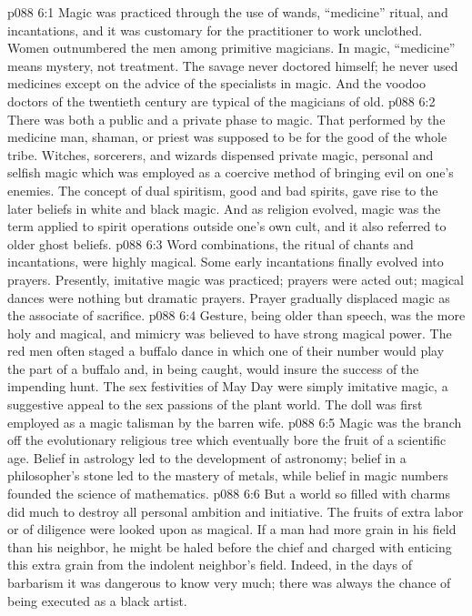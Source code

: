 \vs p088 6:1 Magic was practiced through the use of wands, “medicine” ritual, and incantations, and it was customary for the practitioner to work unclothed. Women outnumbered the men among primitive magicians. In magic, “medicine” means mystery, not treatment. The savage never doctored himself; he never used medicines except on the advice of the specialists in magic. And the voodoo doctors of the twentieth century are typical of the magicians of old.
\vs p088 6:2 There was both a public and a private phase to magic. That performed by the medicine man, shaman, or priest was supposed to be for the good of the whole tribe. Witches, sorcerers, and wizards dispensed private magic, personal and selfish magic which was employed as a coercive method of bringing evil on one’s enemies. The concept of dual spiritism, good and bad spirits, gave rise to the later beliefs in white and black magic. And as religion evolved, magic was the term applied to spirit operations outside one’s own cult, and it also referred to older ghost beliefs.
\vs p088 6:3 Word combinations, the ritual of chants and incantations, were highly magical. Some early incantations finally evolved into prayers. Presently, imitative magic was practiced; prayers were acted out; magical dances were nothing but dramatic prayers. Prayer gradually displaced magic as the associate of sacrifice.
\vs p088 6:4 Gesture, being older than speech, was the more holy and magical, and mimicry was believed to have strong magical power. The red men often staged a buffalo dance in which one of their number would play the part of a buffalo and, in being caught, would insure the success of the impending hunt. The sex festivities of May Day were simply imitative magic, a suggestive appeal to the sex passions of the plant world. The doll was first employed as a magic talisman by the barren wife.
\vs p088 6:5 \pc Magic was the branch off the evolutionary religious tree which eventually bore the fruit of a scientific age. Belief in astrology led to the development of astronomy; belief in a philosopher’s stone led to the mastery of metals, while belief in magic numbers founded the science of mathematics.
\vs p088 6:6 \pc But a world so filled with charms did much to destroy all personal ambition and initiative. The fruits of extra labor or of diligence were looked upon as magical. If a man had more grain in his field than his neighbor, he might be haled before the chief and charged with enticing this extra grain from the indolent neighbor’s field. Indeed, in the days of barbarism it was dangerous to know very much; there was always the chance of being executed as a black artist.
